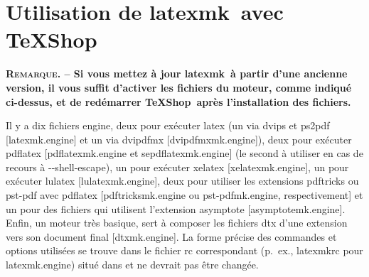 \documentclass[11pt,french]{article}
\newcommand{\TS}{\textsf{\TeX Shop}}
\newcommand{\latexmk}{\textsf{latexmk}}
\newcommand{\cmd}[1]{\textsf{#1}}
\begin{document}
%
%


\section{Utilisation de \latexmk\ avec \TS}%

\noindent\textbf{\textsc{Remarque}. -- Si vous mettez à jour \latexmk\ à partir d'une ancienne version, il vous suffit d'activer les fichiers du moteur, comme indiqué ci-dessus, et de redémarrer \TS\ après l'installation des fichiers.}

Il y a dix fichiers \cmd{engine}, deux pour exécuter \cmd{latex} (un via \cmd{dvips} et \cmd{ps2pdf} [\cmd{latexmk.engine}] et un via \cmd{dvipdfmx} [\cmd{dvipdfmxmk.engine}]), deux pour exécuter \cmd{pdflatex} [\cmd{pdflatexmk.engine} et \cmd{sepdflatexmk.engine}] (le second à utiliser en cas de recours à \cmd{-{}-shell-escape}), un pour exécuter \cmd{xelatex} [\cmd{xelatexmk.engine}], un pour exécuter \cmd{lulatex} [\cmd{lulatexmk.engine}], deux pour utiliser les extensions \cmd{pdftricks} ou \cmd{pst-pdf} avec \cmd{pdflatex} [\cmd{pdftricksmk.engine} ou \cmd{pst-pdfmk.engine}, respectivement] et un pour des fichiers qui utilisent l'extension \cmd{asymptote} [\cmd{asymptotemk.engine}]. Enfin, un moteur très basique, sert à composer les fichiers \cmd{dtx} d'une extension vers son document final [\cmd{dtxmk.engine}]. La forme précise des commandes et options utilisées se trouve dans le fichier \cmd{rc} correspondant (p.~ex., \cmd{latexmkrc} pour \cmd{latexmk.engine}) situé dans  et ne devrait pas être changée.
\end{document}
